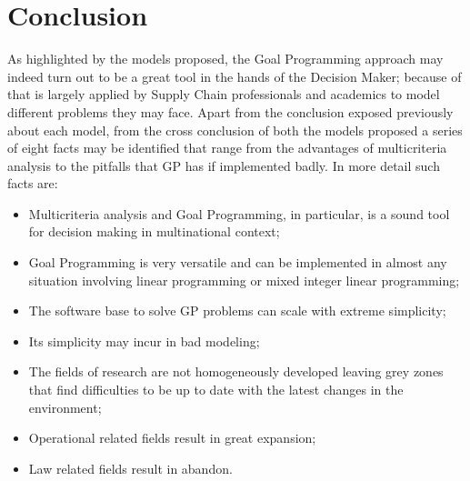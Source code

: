 \clearpage{\pagestyle{empty}\cleardoublepage}
\chapter*{Conclusion}

\begin{doublespace}
As highlighted by the models proposed, the Goal Programming approach may indeed turn out to be a great tool in the hands of the Decision Maker; because of that is largely applied by Supply Chain professionals and academics to model different problems they may face. Apart from the conclusion exposed previously about each model, from the cross conclusion of both the models proposed a series of eight facts may be identified that range from the advantages of multicriteria analysis to the pitfalls that GP has if implemented badly. In more detail such facts are:

\begin{itemize}
    \item Multicriteria analysis and Goal Programming, in particular, is a sound tool for decision making in multinational context;
    \item Goal Programming is very versatile and can be implemented in almost any situation involving linear programming or mixed integer linear programming;
    \item The software base to solve GP problems can scale with extreme simplicity;
    \item Its simplicity may incur in bad modeling;
    \item The fields of research are not homogeneously developed leaving grey zones that find difficulties to be up to date with the latest changes in the environment;
    \item Operational related fields result in great expansion;
    \item Law related fields result in abandon.
\end{itemize}


\end{doublespace}

